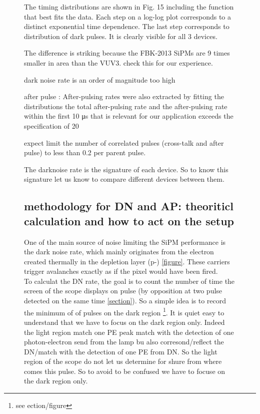 \begin{figure}[!hbtp]
  The timing distributions are shown in Fig. 15 including the function that best fits the data. Each step on a log-log plot
  corresponds to a distinct exponential time dependence. The last step corresponds to distribution of dark pulses. It is clearly
  visible for all 3 devices. 
  
  The difference is striking because the FBK-2013 SiPMs are 9 times smaller in area than the VUV3. check this for our experience. 
  
  dark noise rate is an order of magnitude too high
  
  after pulse : After-pulsing rates were also extracted by fitting the distributions
  the total after-pulsing rate and the after-pulsing rate within the first 10 μs that is relevant for our application
  exceeds the specification of 20%
  
  expect limit the number of correlated pulses (cross-talk and after pulse) to less than 0.2 per parent pulse.
  
  
  
  
  
  The darknoise rate is the signature of each device. So to know this signature let us know to compare different devices between them. 
   
  \subsection{methodology for DN and AP: theoriticl calculation and how to act on the setup}
  
  One of the main source of noise limiting the SiPM performance is the dark noise rate, which mainly originates from the electron 
  created thermally in the depletion layer (p-) \ref{figure}. These carriers trigger avalanches exactly as if the pixel would have been fired.
  \\
  To calculat the DN rate, the goal is to count the number of time the screen of the scope
  displays on pulse (by opposition at two pulse detected on the same time \ref{section}). So a simple idea is 
  to record the minimum of of pulses on the dark region \footnote{see ection/figure}. It is quiet easy to understand
  that we have to focus on the dark region only. Indeed the light region match one PE peak match with the detection of one photon-electron send from
  the lamp bu also corresond/reflect the DN/match with the detection of one PE from DN. So the light region of the scope do not let us determine for shure from where comes 
  this pulse. So to avoid to be confused we have to focuse on the dark region only. 
  \\
  

\end{figure}
